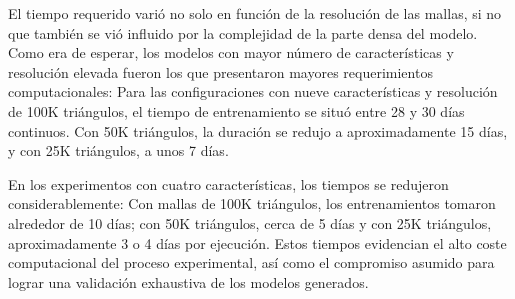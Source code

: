 El tiempo requerido varió no solo en función de la resolución de las mallas, si no que también se vió influido por la complejidad de la parte densa del modelo. Como era de esperar, los modelos con mayor número de características y resolución elevada fueron los que presentaron mayores requerimientos computacionales: Para las configuraciones con nueve características y resolución de 100K triángulos, el tiempo de entrenamiento se situó entre 28 y 30 días continuos. Con 50K triángulos, la duración se redujo a aproximadamente 15 días, y con 25K triángulos, a unos 7 días.

En los experimentos con cuatro características, los tiempos se redujeron considerablemente: Con mallas de 100K triángulos, los entrenamientos tomaron alrededor de 10 días; con 50K triángulos, cerca de 5 días y con 25K triángulos, aproximadamente 3 o 4 días por ejecución. Estos tiempos evidencian el alto coste computacional del proceso experimental, así como el compromiso asumido para lograr una validación exhaustiva de los modelos generados.

